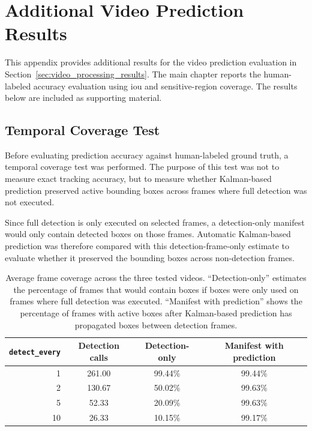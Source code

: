 \chapter{Additional Video Prediction Results}
\label{app:video_prediction_additional_results}

This appendix provides additional results for the video prediction evaluation in Section~\ref{sec:video_processing_results}. The main chapter reports the human-labeled accuracy evaluation using \acrshort{iou} and sensitive-region coverage. The results below are included as supporting material.

\section{Temporal Coverage Test}
Before evaluating prediction accuracy against human-labeled ground truth, a temporal coverage test was performed. The purpose of this test was not to measure exact tracking accuracy, but to measure whether Kalman-based prediction preserved active \gls{bounding box}es across frames where full detection was not executed.

Since full detection is only executed on selected frames, a detection-only manifest would only contain detected boxes on those frames. Automatic Kalman-based prediction was therefore compared with this detection-frame-only estimate to evaluate whether it preserved the \gls{bounding box}es across non-detection frames.

\begin{table}[H]
\centering
\begin{tabular}{rccc}
\toprule
\textbf{\texttt{detect\_every}} & \textbf{Detection calls} & \textbf{Detection-only} & \textbf{Manifest with prediction} \\
\midrule
1  & 261.00 & 99.44\% & 99.44\% \\
2  & 130.67 & 50.02\% & 99.63\% \\
5  & 52.33  & 20.09\% & 99.63\% \\
10 & 26.33  & 10.15\% & 99.17\% \\
\bottomrule
\end{tabular}
\caption{Average frame coverage across the three tested videos. ``Detection-only'' estimates the percentage of frames that would contain boxes if boxes were only used on frames where full detection was executed. ``Manifest with prediction'' shows the percentage of frames with active boxes after Kalman-based prediction has propagated boxes between detection frames.}
\label{tab:video_temporal_coverage_appendix}
\end{table}

